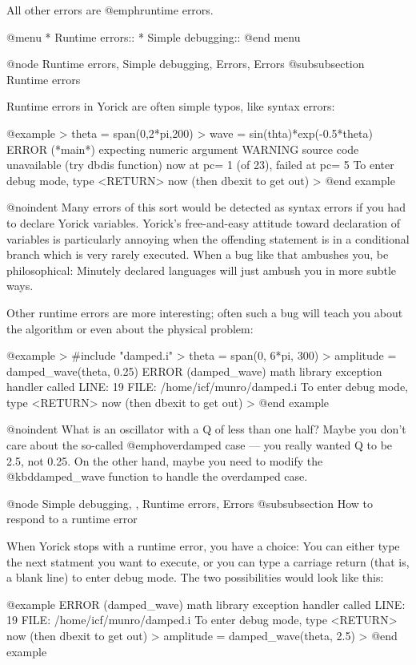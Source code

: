 All other errors are @emph{runtime} errors.

@menu
* Runtime errors::              
* Simple debugging::            
@end menu

@node Runtime errors, Simple debugging, Errors, Errors
@subsubsection Runtime errors

Runtime errors in Yorick are often simple typos, like syntax errors:

@example
> theta = span(0,2*pi,200)
> wave = sin(thta)*exp(-0.5*theta)
ERROR (*main*) expecting numeric argument
WARNING source code unavailable (try dbdis function)
now at pc= 1 (of 23), failed at pc= 5
 To enter debug mode, type <RETURN> now (then dbexit to get out)
> 
@end example

@noindent
Many errors of this sort would be detected as syntax errors if you had
to declare Yorick variables.  Yorick's free-and-easy attitude toward
declaration of variables is particularly annoying when the offending
statement is in a conditional branch which is very rarely executed.
When a bug like that ambushes you, be philosophical: Minutely declared
languages will just ambush you in more subtle ways.

Other runtime errors are more interesting; often such a bug will teach
you about the algorithm or even about the physical problem:

@example
> #include "damped.i"
> theta = span(0, 6*pi, 300)
> amplitude = damped_wave(theta, 0.25)
ERROR (damped_wave) math library exception handler called
  LINE: 19  FILE: /home/icf/munro/damped.i
 To enter debug mode, type <RETURN> now (then dbexit to get out)
>
@end example

@noindent
What is an oscillator with a Q of less than one half?  Maybe you don't
care about the so-called @emph{overdamped} case --- you really wanted
Q to be 2.5, not 0.25.  On the other hand, maybe you need to modify
the @kbd{damped_wave} function to handle the overdamped case.


@node Simple debugging,  , Runtime errors, Errors
@subsubsection How to respond to a runtime error

When Yorick stops with a runtime error, you have a choice: You can
either type the next statment you want to execute, or you can type a
carriage return (that is, a blank line) to enter debug mode.  The two
possibilities would look like this:

@example
ERROR (damped_wave) math library exception handler called
  LINE: 19  FILE: /home/icf/munro/damped.i
 To enter debug mode, type <RETURN> now (then dbexit to get out)
> amplitude = damped_wave(theta, 2.5)
>
@end example

